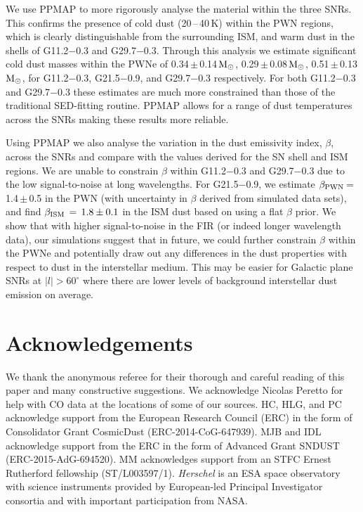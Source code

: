 \documentclass[fleqn,usenatbib]{mnras}
\newcommand\PPMAPMassa{0.34}
\newcommand\PPMAPMassErra{0.14}
\newcommand\PPMAPMassb{0.29}
\newcommand\PPMAPMassErrb{0.08}
\newcommand\PPMAPMassc{0.51}
\newcommand\PPMAPMassErrc{0.13}
\begin{document}
{{We use PPMAP to more rigorously analyse the material within the three SNRs. This confirms the presence of cold dust (20\,--\,40\,K) within the PWN regions, which is clearly distinguishable from the surrounding ISM, and warm dust in the shells of G11.2$-$0.3 and G29.7$-$0.3. Through this analysis we estimate significant cold dust masses within the PWNe of \PPMAPMassa\,$\pm$\,\PPMAPMassErra\,$\rm M_{\odot}$, \PPMAPMassb\,$\pm$\,\PPMAPMassErrb\,$\rm M_{\odot}$, \PPMAPMassc\,$\pm$\,\PPMAPMassErrc\,$\rm M_{\odot}$, for G11.2$-$0.3, G21.5$-$0.9, and G29.7$-$0.3 respectively. For both G11.2$-$0.3 and G29.7$-$0.3 these estimates are much more constrained than those of the traditional SED-fitting routine. PPMAP allows for a range of dust temperatures across the SNRs making these results more reliable.

Using PPMAP we also analyse the variation in the dust emissivity index, $\beta$, across the SNRs and compare with the values derived for the SN shell and ISM regions. We are unable to constrain $\beta$ within G11.2$-$0.3 and G29.7$-$0.3 due to the low signal-to-noise at long wavelengths.  For G21.5$-$0.9, we estimate $\beta_{\rm PWN}$\,=\,1.4\,$\pm$\,0.5 in the PWN (with uncertainty in $\beta$ derived from simulated data sets), and find $\beta_{\rm ISM}\,=\,1.8 \pm 0.1$ in the ISM dust based on using a flat $\beta$ prior. We show that with higher signal-to-noise in the FIR (or indeed longer wavelength data), our simulations suggest that in future, we could further constrain $\beta$ within the PWNe and potentially draw out any differences in the dust properties with respect to dust in the interstellar medium. This may be easier for Galactic plane SNRs at $\mid l \mid >60^{\circ}$ where there are lower levels of background interstellar dust emission on average.


\section*{Acknowledgements}
We thank the anonymous referee for their thorough and careful reading of this paper and many constructive suggestions.
We acknowledge Nicolas Peretto for help with CO data at the locations of some of our sources.
HC, HLG, and PC acknowledge support from the European Research Council (ERC) in the form of Consolidator Grant
{\sc CosmicDust} (ERC-2014-CoG-647939).  MJB and IDL acknowledge support from the ERC in the form of Advanced Grant SNDUST (ERC-2015-AdG-694520).
MM acknowledges support from an STFC Ernest Rutherford fellowship (ST/L003597/1). \textit{Herschel} is an ESA space observatory with science instruments provided by European-led Principal Investigator consortia and with important participation from NASA.

}}
\end{document}
